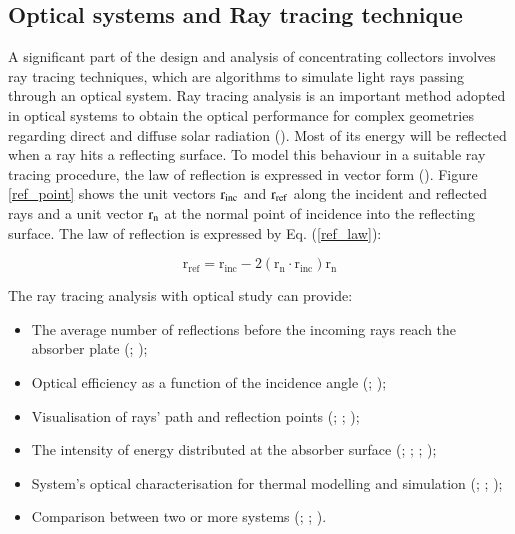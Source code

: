 \subsection{Optical systems and Ray tracing technique}

A significant part of the design and analysis of concentrating collectors involves ray tracing techniques, which are algorithms to simulate light rays passing through an optical system. Ray tracing analysis is an important method adopted in optical systems to obtain the optical performance for complex geometries regarding direct and diffuse solar radiation (\cite{Ali2013}). Most of its energy will be reflected when a ray hits a reflecting surface. To model this behaviour in a suitable ray tracing procedure, the law of reflection is expressed in vector form (\cite{Winston2005}). Figure \ref{ref_point} shows the unit vectors $\rm{r_{inc}}$ and $\rm{r_{ref}}$ along the incident and reflected rays and a unit vector $\rm{r_n}$ at the normal point of incidence into the reflecting surface. The law of reflection is expressed by Eq. (\ref{ref_law}):

\begin{equation}
	\mathrm{{r_{ref}} = {r_{inc}} - 2({r_n} \cdot {r_{inc}}){r_n}}
	\label{ref_law}
	\end{equation}


The ray tracing analysis with optical study can provide:

\begin{itemize}
	\itemsep-5pt
		\item The average number of reflections before the incoming rays reach the absorber plate (\cite{Shams2013}; \cite{Benrejeb2016});
		\item Optical efficiency as a function of the incidence angle (\cite{Kothdiwala1996}; \cite{Souliotis2011});
		\item Visualisation of rays' path and reflection points (\cite{Mallick2007}; \cite{Ratismith2014}; \cite{Ustaoglu2016});
		\item The intensity of energy distributed at the absorber surface (\cite{Smyth1999}; \cite{Sellami2013}; \cite{Ali2014}; \cite{Bellos2016});
		\item System's optical characterisation for thermal modelling and simulation (\cite{Mallick2007}; \cite{Shams2013}; \cite{Bellos2016});
		\item Comparison between two or more systems (\cite{Zacharopoulos2000}; \cite{Sarmah2011}; \cite{Wu2009}).
	\end{itemize}

